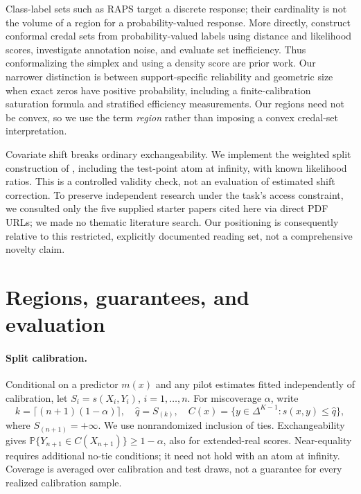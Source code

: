 \documentclass{article}
\newcommand{\D}{\Delta^{K-1}}
\newcommand{\Pp}{\mathbb P}
\begin{document}
Class-label sets such as RAPS \citep{angelopoulos2020} target a discrete response; their cardinality is not the volume of a region for a probability-valued response. More directly, \citet{javanmardi2024} construct conformal credal sets from probability-valued labels using distance and likelihood scores, investigate annotation noise, and evaluate set inefficiency. Thus conformalizing the simplex and using a density score are prior work. Our narrower distinction is between support-specific reliability and geometric size when exact zeros have positive probability, including a finite-calibration saturation formula and stratified efficiency measurements. Our regions need not be convex, so we use the term \emph{region} rather than imposing a convex credal-set interpretation.

Covariate shift breaks ordinary exchangeability. We implement the weighted split construction of \citet{tibshirani2019}, including the test-point atom at infinity, with known likelihood ratios. This is a controlled validity check, not an evaluation of estimated shift correction. To preserve independent research under the task's access constraint, we consulted only the five supplied starter papers cited here via direct PDF URLs; we made no thematic literature search. Our positioning is consequently relative to this restricted, explicitly documented reading set, not a comprehensive novelty claim.

\section{Regions, guarantees, and evaluation}
\label{sec:methods}
\paragraph{Split calibration.}
Conditional on a predictor $m(x)$ and any pilot estimates fitted independently of calibration, let $S_i=s(X_i,Y_i)$, $i=1,\ldots,n$. For miscoverage $\alpha$, write
\begin{equation}
 k=\lceil(n+1)(1-\alpha)\rceil,\quad
 \widehat q=S_{(k)},\quad C(x)=\{y\in\D:s(x,y)\le\widehat q\},
 \label{eq:split}
\end{equation}
where $S_{(n+1)}=+\infty$. We use nonrandomized inclusion of ties. Exchangeability gives $\Pp\{Y_{n+1}\in C(X_{n+1})\}\ge1-\alpha$, also for extended-real scores. Near-equality requires additional no-tie conditions; it need not hold with an atom at infinity. Coverage is averaged over calibration and test draws, not a guarantee for every realized calibration sample.
\end{document}
